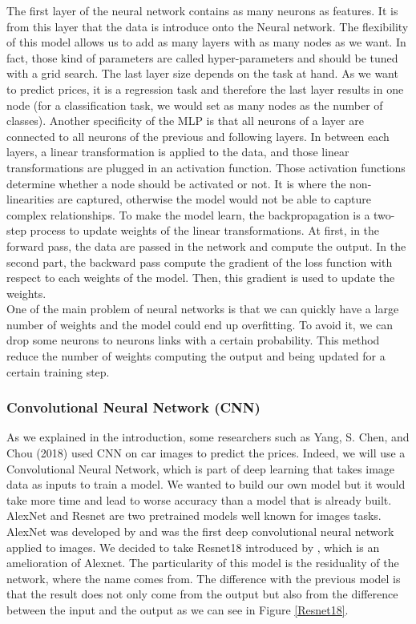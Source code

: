 \documentclass[12pt]{article}
\begin{document}
\noindent The first layer of the neural network contains as many neurons as features. It is from this layer that the data is introduce onto the Neural network. The flexibility of this model allows us to add as many layers with as many nodes as we want. In fact, those kind of parameters are called hyper-parameters and should be tuned with a grid search. The last layer size depends on the task at hand. As we want to predict prices, it is a regression task and therefore the last layer results in one node (for a classification task, we would set as many nodes as the number of classes). Another specificity of the MLP is that all neurons of a layer are connected to all neurons of the previous and following layers.
In between each layers, a linear transformation is applied to the data, and those linear transformations are plugged in an activation function. Those activation functions determine whether a node should be activated or not. It is where the non-linearities are captured, otherwise the model would not be able to capture complex relationships. To make the model learn, the backpropagation is a two-step process to update weights of the linear transformations. At first, in the forward pass, the data are passed in the network and compute the output. In the second part, the backward pass compute the gradient of the loss function with respect to each weights of the model. Then, this gradient is used to update the weights.\\

\noindent One of the main problem of neural networks is that we can quickly have a large number of weights and the model could end up overfitting. To avoid it, we can drop some neurons to neurons links with a certain probability. This method reduce the number of weights computing the output and being updated for a certain training step. 


\subsubsection{Convolutional Neural Network (CNN)}

\noindent As we explained in the introduction, some researchers such as Yang, S. Chen, and Chou (2018) used CNN on car images to predict the prices. Indeed, we will use a Convolutional Neural Network, which is part of deep learning that takes image data as inputs to train a model. We wanted to build our own model but it would take more time and lead to worse accuracy than a model that is already built. AlexNet and Resnet are two pretrained models well known for images tasks. AlexNet was developed by \cite{Krizhevsky2012} and was the first deep convolutional neural network applied to images. We decided to take Resnet18 introduced by \cite{Kaiming2016}, which is an amelioration of Alexnet. The particularity of this model is the residuality of the network, where the name comes from. The difference with the previous model is that the result does not only come from the output but also from the difference between the input and the output as we can see in Figure \ref{Resnet18}.
\end{document}
